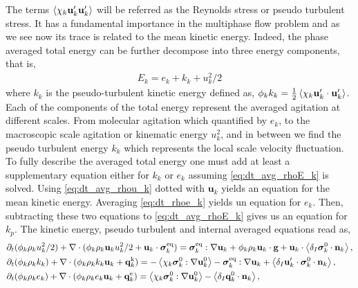 The terms $\left<\chi_k \textbf{u}_k'\textbf{u}_k'\right>$ will be referred as the Reynolds stress or pseudo turbulent stress. 
It has a fundamental importance in the multiphase flow problem and as we see now its trace is related to the mean kinetic energy. 
Indeed, the phase averaged total energy can be further decompose into three energy components, that is,  
\begin{align}
    E_k = e_k + k_k + u_k^2/2
    \label{eq:E_def2}
\end{align}
where $k_k$ is the pseudo-turbulent kinetic energy defined as, $\phi_k k_k = \frac{1}{2}\left<\chi_k \textbf{u}_k'\cdot \textbf{u}_k'\right>$. 
Each of the components of the total energy represent the averaged agitation at different scales. 
From molecular agitation which quantified by $e_k$, to the macroscopic scale agitation or kinematic energy $u_k^2$, and in between we find the pseudo turbulent energy $k_k$ which represents the local scale velocity fluctuation. 
To fully describe the averaged total energy one must add at least a supplementary equation either for $k_k$ or $e_k$ assuming \ref{eq:dt_avg_rhoE_k} is solved. 
Using \ref{eq:dt_avg_rhou_k} dotted with $\textbf{u}_k$ yields an equation for the mean kinetic energy. 
Averaging \ref{eq:dt_rhoe_k} yields un equation for $e_k$.  
Then, subtracting these two equations to \ref{eq:dt_avg_rhoE_k} gives us an equation for $k_p$. 
The kinetic energy, pseudo turbulent and internal averaged equations read as, 
\begin{align}
    \label{eq:dt_avg_uk2}
    &\partial_t (\phi_k \rho_ku_k^2/2)  
    + \mathbf{\nabla}\cdot (
        \phi_k \rho_k\textbf{u}_ku_k^2/2
        + \textbf{u}_k \cdot \bm{\sigma}_k^\text{eq}
    )
    = 
    \bm{\sigma}_k^\text{eq} : \mathbf{\nabla} \textbf{u}_k
    + \phi_k \rho_k \textbf{u}_k\cdot \textbf{g} 
    +  \textbf{u}_k\cdot \left<\delta_I \bm{\sigma}_k^0 \cdot \textbf{n}_k\right>,\\
    \label{eq:dt_avg_kk}
    &\partial_t (\phi_k\rho_kk_k)  
    + \mathbf{\nabla}\cdot (
        \phi_k\rho_kk_k\textbf{u}_k
        + \textbf{q}_k^\text{k} 
        )
    = 
    - \left<\chi_k\bm{\sigma}_k^0 : \mathbf{\nabla} \textbf{u}_k^0\right>
    - \bm{\sigma}_k^\text{eq} : \mathbf{\nabla} \textbf{u}_k
    + \left<\delta_I \textbf{u}_k' \cdot \bm{\sigma}_k^0 \cdot \textbf{n}_k\right>,\\
    \label{eq:dt_avg_ek}
    &\partial_t (\phi_k\rho_ke_k)  
    + \mathbf{\nabla}\cdot (
        \phi_k \rho_ke_k\textbf{u}_k
        +
        \textbf{q}_k^\text{e} 
        )
    = 
    \left<\chi_k\bm{\sigma}_k^0 : \mathbf{\nabla} \textbf{u}_k^0\right>
    - \left<\delta_I \textbf{q}_k^0 \cdot \textbf{n}_k\right>,
\end{align}
